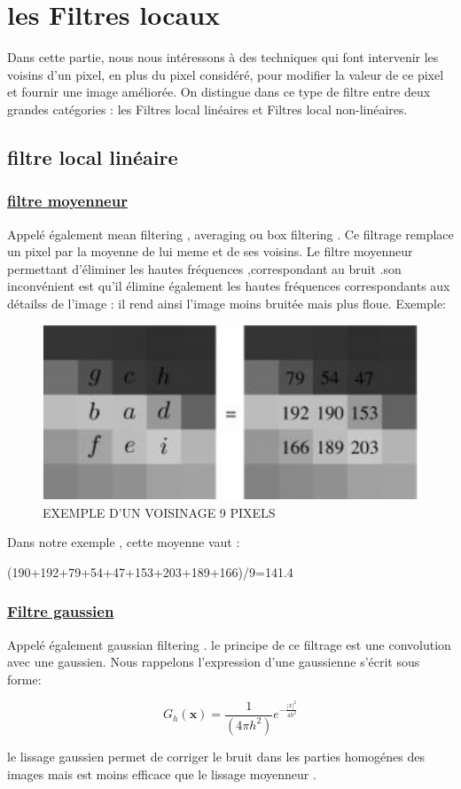 \documentclass[12pt,a4paper]{report}
\numberwithin{equation}{subsection}
\numberwithin{equation}{section}
\begin{document}
\section{ les Filtres locaux }
Dans cette partie, nous nous intéressons à des techniques qui font intervenir les
voisins d'un pixel, en plus du pixel considéré, pour modifier la valeur de ce pixel et fournir
une image améliorée.
On distingue dans ce type de filtre entre deux grandes catégories : les Filtres local
linéaires et Filtres local non-linéaires.
\newline

\subsection{filtre local linéaire }
\subsubsection{ \underline {filtre moyenneur}}
Appelé également mean filtering , averaging ou box filtering .
Ce filtrage remplace un pixel par la moyenne de lui meme et de ses voisins.
\newline
 Le filtre moyenneur permettant d'éliminer les hautes fréquences ,correspondant au bruit .son inconvénient est qu'il élimine également les hautes fréquences correspondants aux détailss de l'image : il rend ainsi l'image moins bruitée mais plus floue. 
\newline
Exemple:
\begin{figure}[h!]
    \centering
    \includegraphics[width=.4\textwidth]{c.PNG}
   
    \label{fig3}
   \caption{EXEMPLE D’UN VOISINAGE 9 PIXELS}
\end{figure}
\newline

Dans notre exemple , cette moyenne vaut :

\newline 

\begin{center}
    (190+192+79+54+47+153+203+189+166)/9=141.4
\end{center}
\subsubsection{ \underline{ Filtre gaussien}}
Appelé également gaussian filtering .
le principe de ce filtrage est une convolution avec une gaussien. \newline
Nous rappelons l'expression d'une gaussienne s'écrit sous forme:
\begin{figure}[h!]
   $$G_{h}(\mathbf{x})=\frac{1}{\left(4 \pi h^{2}\right)} e^{-\frac{|x|^{2}}{4 h^{2}}}$$
\end{figure}
\newline
le lissage gaussien permet de corriger le bruit dans les parties homogénes des images mais est moins efficace que le lissage moyenneur .
\end{document}
